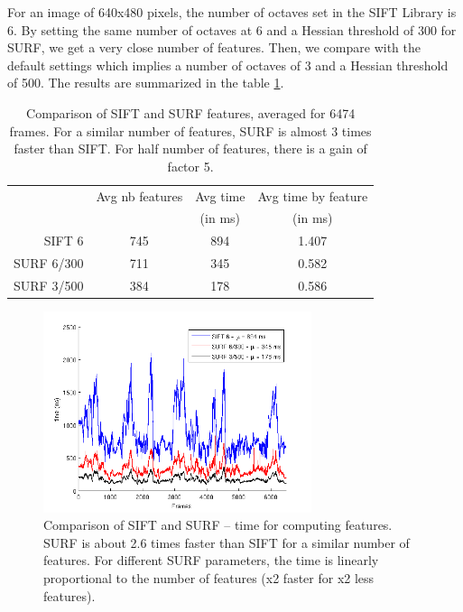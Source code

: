 For an image of 640x480 pixels, the number of octaves set in the SIFT Library is 6. By setting the same number of octaves at 6 and a Hessian threshold of 300 for \gls{SURF}, we get a very close number of features. Then, we compare with the default settings which implies a number of octaves of 3 and a Hessian threshold of 500. The results are summarized in the table \ref{tab:stats_features}.

\begin{table}[h]
 \begin{center}
 \begin{tabular}{r|ccc}
 & Avg nb features & Avg time & Avg time by feature \\
 &  & (in ms) & (in ms) \\
 \hline
 SIFT 6 & 745 & 894 & 1.407\\
 SURF 6/300 & 711  & 345  & 0.582 \\
 SURF 3/500 & 384 & 178 & 0.586 \\
 \end{tabular}
\caption{Comparison of SIFT and SURF features, averaged for 6474 frames. For a similar number of features, SURF is almost 3 times faster than SIFT. For half number of features, there is a gain of factor 5.}
\label{tab:stats_features}
\end{center}
\end{table}

\clearpage

\begin{figure}[H]
\begin{center}
\includegraphics[width=0.7\textwidth]{figures/stats_features_time}
\caption{Comparison of SIFT and SURF -- time for computing features. SURF is about 2.6 times faster than SIFT for a similar number of features. For different SURF parameters, the time is linearly proportional to the number of features (x2 faster for x2 less features).}
\end{center}
\end{figure}

